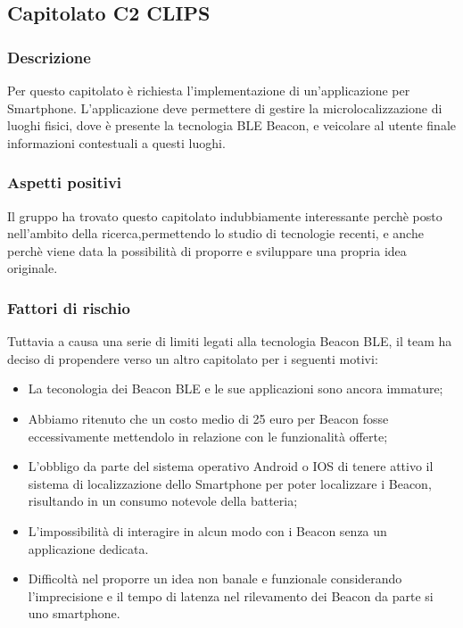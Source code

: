 \documentclass[12pt,a4paper]{article}
\begin{document}
\newpage

\subsection{Capitolato C2 CLIPS}

\subsubsection{Descrizione}

Per questo capitolato è richiesta l'implementazione di un'applicazione per Smartphone. L'applicazione deve permettere di gestire la microlocalizzazione di luoghi fisici, dove è presente la tecnologia BLE Beacon, e veicolare al utente finale informazioni contestuali a questi luoghi. 

\subsubsection{Aspetti positivi}

Il gruppo ha trovato questo capitolato indubbiamente interessante perchè  posto nell'ambito della ricerca,permettendo lo studio di tecnologie recenti, e anche perchè viene data la possibilità di proporre e sviluppare una propria idea originale.

\subsubsection{Fattori di rischio}

Tuttavia a causa una serie di limiti legati alla tecnologia Beacon BLE, il team ha deciso di propendere verso un altro capitolato per i seguenti motivi:

\begin{itemize}
\item La teconologia dei Beacon BLE e le sue applicazioni sono ancora immature;
\item Abbiamo ritenuto che un costo medio di 25 euro per Beacon fosse eccessivamente mettendolo in relazione con le funzionalità offerte;
\item L'obbligo da parte del sistema operativo Android o IOS di tenere attivo il sistema di localizzazione dello Smartphone per poter localizzare i Beacon, risultando in un consumo notevole della batteria;
\item L'impossibilità di interagire in alcun modo con i Beacon senza un applicazione dedicata.
\item Difficoltà nel proporre un idea non banale e funzionale considerando l'imprecisione e il tempo di latenza nel rilevamento dei Beacon da parte si uno smartphone.
\end{itemize}
\end{document}

